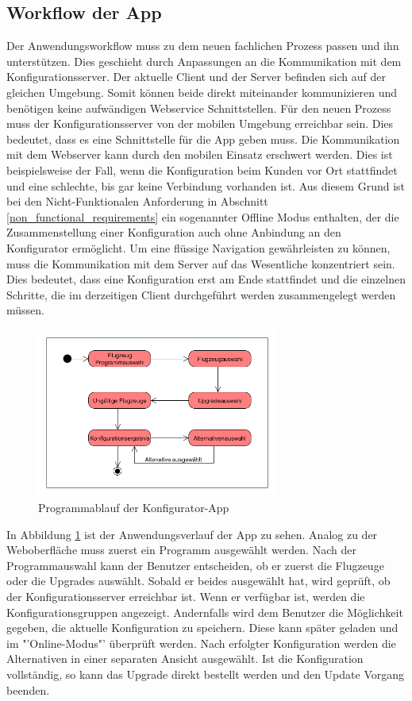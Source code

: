 \subsection{Workflow der App}
Der Anwendungsworkflow muss zu dem neuen fachlichen Prozess passen und ihn unterstützen. Dies geschieht durch Anpassungen an die Kommunikation mit dem Konfigurationsserver. 
Der aktuelle Client und der Server befinden sich auf der gleichen Umgebung. Somit können beide direkt miteinander kommunizieren und benötigen keine aufwändigen Webservice Schnittstellen. Für den neuen Prozess muss der Konfigurationsserver von der mobilen Umgebung erreichbar sein. Dies bedeutet, dass es eine Schnittstelle für die App geben muss. Die Kommunikation mit dem Webserver kann durch den mobilen Einsatz erschwert werden. Dies ist beispielsweise der Fall, wenn die Konfiguration beim Kunden vor Ort stattfindet und eine schlechte, bis gar keine Verbindung vorhanden ist. Aus diesem Grund ist bei den Nicht-Funktionalen Anforderung in Abschnitt \ref{non_functional_requirements} ein sogenannter Offline Modus enthalten, der die Zusammenstellung einer Konfiguration auch ohne Anbindung an den Konfigurator ermöglicht. Um eine flüssige Navigation gewährleisten zu können, muss die Kommunikation mit dem Server auf das Wesentliche konzentriert sein. Dies bedeutet, dass eine Konfiguration erst am Ende stattfindet und die einzelnen Schritte, die im derzeitigen Client durchgeführt werden zusammengelegt werden müssen. \par
\begin{figure}
\label{appWorkflow}
\centering
\includegraphics[width=300px]{images/workflow_webgui}
\caption{Programmablauf der Konfigurator-App}
\end{figure}
In Abbildung \ref{appWorkflow} ist der Anwendungsverlauf der App zu sehen. Analog zu der Weboberfläche muss zuerst ein Programm ausgewählt werden. Nach der Programmauswahl kann der Benutzer entscheiden, ob er zuerst die Flugzeuge oder die Upgrades auswählt. Sobald er beides ausgewählt hat, wird geprüft, ob der Konfigurationsserver erreichbar ist. Wenn er verfügbar ist, werden die Konfigurationsgruppen angezeigt. Andernfalls wird dem Benutzer die Möglichkeit gegeben, die aktuelle Konfiguration zu speichern. Diese kann später geladen und im "'Online-Modus"' überprüft werden. Nach erfolgter Konfiguration werden die Alternativen in einer separaten Ansicht ausgewählt. Ist die Konfiguration vollständig, so kann das Upgrade direkt bestellt werden und den Update Vorgang beenden. \par

